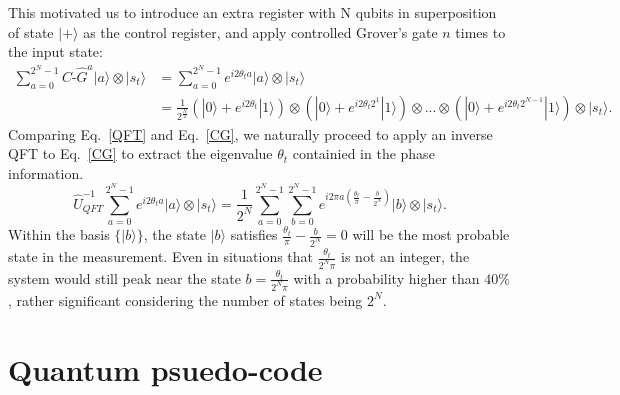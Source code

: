 \documentclass[aps,prd,nofootinbib,twocolumn,reprint,superscriptaddress,showpacs,showkeys,longbibliography]{revtex4-1}
\newcommand{\ket}[1]{|#1\rangle}
\begin{document}
This motivated us to introduce an extra register with N qubits in superposition of state $\ket{+}$ as the control register, and apply controlled Grover's gate $n$ times to the input state:
\begin{equation}
\begin{split}
   \label{CG}
    \sum_{a=0}^{2^N-1}C\text{-}\hat{G}^a\ket{a}\otimes \ket{s_t}&=\sum_{a=0}^{2^N-1}e^{i2\theta_t a}\ket{a}\otimes\ket{s_t}\\
    &=\frac{1}{2^{\frac{N}{2}}}(\ket{0}+e^{i2\theta_t }\ket{1})\otimes(\ket{0}+e^{i2\theta_t2^1}\ket{1})\otimes...\otimes(\ket{0}+e^{i2\theta_t2^{N-1}}\ket{1})\otimes\ket{s_t}.
\end{split}
\end{equation}
Comparing Eq.~\ref{QFT} and Eq.~\ref{CG}, we naturally proceed to apply an inverse QFT to Eq.~\ref{CG} to extract the eigenvalue $\theta_t$ containied in the phase information.
\begin{equation}
   \label{InverQFT}
   \hat{U}^{-1}_{QFT}\sum_{a=0}^{2^N-1}e^{i2\theta_t a}\ket{a}\otimes\ket{s_t}=\frac{1}{2^{N}}\sum_{a=0}^{2^N-1} \sum_{b=0}^{2^N-1} e^{i2\pi a(\frac{\theta_t}{\pi}-\frac{b}{2^N})}\ket{b}\otimes\ket{s_t}.%
\end{equation}
Within the basis $\{\ket{b}\}$, the state $\ket{b}$ satisfies $\frac{\theta_t}{\pi}-\frac{b}{2^N}=0$ will be the most probable state in the measurement. Even in situations that $\frac{\theta_t}{2^N\pi}$ is not an integer, the system would still peak near the state $b=\frac{\theta_t}{2^N\pi}$ with a probability higher than $40\%$\cite{nielsen2011quantum}, rather significant considering the number of states being $2^N$.

\section{Quantum psuedo-code}\label{sec:psuedocode}
\end{document}
